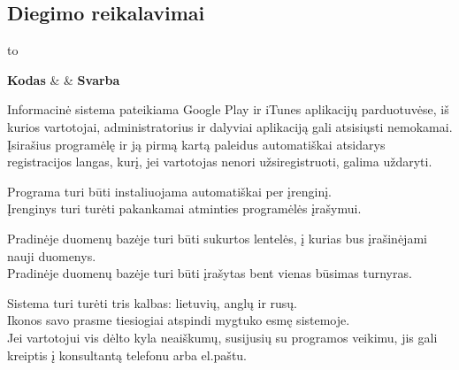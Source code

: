 \documentclass{VUMIFPSkursinis}
\begin{document}
\subsection*{Diegimo reikalavimai}
  \begin{longtabu} to 
    \caption{Diegimo reikalavimai}
    \label{table:diegimoReikalavimai}
    \endfirsthead
    \endhead
    \hline
    \textbf{Kodas} &  & \textbf{Svarba} \\
    \hline
	
    {
      Informacinė sistema pateikiama Google Play ir iTunes aplikacijų parduotuvėse, iš kurios vartotojai, 
      administratorius ir dalyviai aplikaciją gali atsisiųsti nemokamai. \\
      Įsirašius programėlę ir ją pirmą kartą paleidus automatiškai atsidarys registracijos langas, kurį, jei vartotojas nenori užsiregistruoti, 
      galima uždaryti.
    }
    
    {
      Programa turi būti instaliuojama automatiškai per įrenginį. \\
      Įrenginys turi turėti pakankamai atminties programėlės įrašymui.
    }
    
    {
      Pradinėje duomenų bazėje turi būti sukurtos lentelės, į kurias bus įrašinėjami nauji duomenys. \\
      Pradinėje duomenų bazėje turi būti įrašytas bent vienas būsimas turnyras.
    }

    {
      Sistema turi turėti tris kalbas: lietuvių, anglų ir rusų. \\
      Ikonos savo prasme tiesiogiai atspindi mygtuko esmę sistemoje. \\
      Jei vartotojui vis dėlto kyla neaiškumų, susijusių su programos veikimu, jis gali kreiptis į konsultantą telefonu arba el.paštu.
    }

	\end{longtabu}
  
\end{document}
